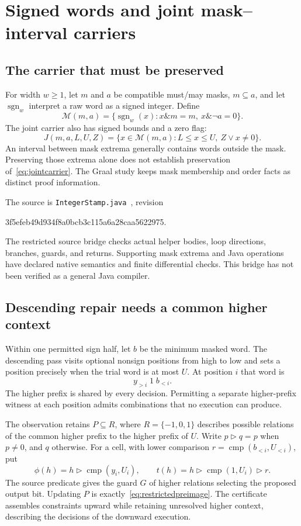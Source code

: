 \section{Signed words and joint mask--interval carriers}\label{sec:wordbounds}

\subsection{The carrier that must be preserved}
For width $w\ge1$, let $m$ and $a$ be compatible must/may masks, $m\subseteq a$, and let $\operatorname{sgn}_w$ interpret a raw word as a signed integer. Define
\[
 \mathcal M(m,a)=\{\operatorname{sgn}_w(x):x\mathbin{\&}m=m,\ x\mathbin{\&}\neg a=0\}.
\]
The joint carrier also has signed bounds and a zero flag:
\begin{equation}\label{eq:jointcarrier}
 J(m,a,L,U,Z)=\{x\in\mathcal M(m,a):L\le x\le U,\ Z\lor x\ne0\}.
\end{equation}
An interval between mask extrema generally contains words outside the mask. Preserving those extrema alone does not establish preservation of~\eqref{eq:jointcarrier}. The Graal study keeps mask membership and order facts as distinct proof information.

The source is \texttt{IntegerStamp.java}~\cite{GraalIntegerStamp}, revision
\begin{center}\small\ttfamily
3f5efeb49d934f8a0bcb3c115a6a28caa5622975.
\end{center}
The restricted source bridge checks actual helper bodies, loop directions, branches, guards, and returns. Supporting mask extrema and Java operations have declared native semantics and finite differential checks. This bridge has not been verified as a general Java compiler.

\subsection{Descending repair needs a common higher context}
Within one permitted sign half, let $b$ be the minimum masked word. The descending pass visits optional nonsign positions from high to low and sets a position precisely when the trial word is at most $U$. At position $i$ that word is
\[
 y_{>i}\;1\;b_{<i}.
\]
The higher prefix is shared by every decision. Permitting a separate higher-prefix witness at each position admits combinations that no execution can produce.

The observation retains $P\subseteq R$, where $R=\{-1,0,1\}$ describes possible relations of the common higher prefix to the higher prefix of $U$. Write $p\triangleright q=p$ when $p\ne0$, and $q$ otherwise. For a cell, with lower comparison $r=\operatorname{cmp}(b_{<i},U_{<i})$, put
\[
 \phi(h)=h\triangleright\operatorname{cmp}(y_i,U_i),\qquad
 t(h)=h\triangleright\operatorname{cmp}(1,U_i)\triangleright r.
\]
The source predicate gives the guard $G$ of higher relations selecting the proposed output bit. Updating $P$ is exactly~\eqref{eq:restrictedpreimage}. The certificate assembles constraints upward while retaining unresolved higher context, describing the decisions of the downward execution.

